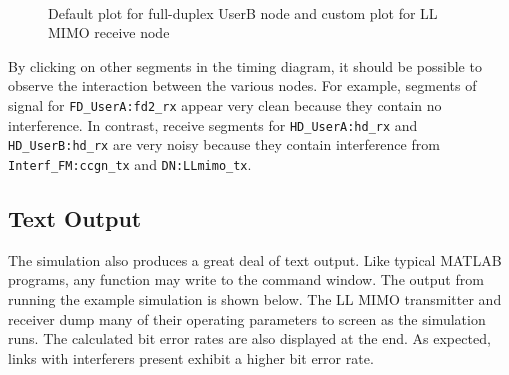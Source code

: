 \begin{figure}[h]
\centering \mbox{
     \quad
     \quad
    }
\caption{Default plot for full-duplex UserB node and custom plot for
LL MIMO receive node} \label{fig:tdCallback}
\end{figure}

By clicking on other segments in the timing diagram, it should be
possible to observe the interaction between the various nodes.  For
example, segments of signal for \verb+FD_UserA:fd2_rx+ appear very
clean because they contain no interference.  In contrast, receive
segments for \verb+HD_UserA:hd_rx+ and \verb+HD_UserB:hd_rx+ are
very noisy because they contain interference from
\verb+Interf_FM:ccgn_tx+ and \verb+DN:LLmimo_tx+.

\subsection{Text Output}

The simulation also produces a great deal of text output.  Like
typical MATLAB programs, any function may write to the command
window.  The output from running the example simulation is shown
below. The LL MIMO transmitter and receiver dump many of their
operating parameters to screen as the simulation runs.  The
calculated bit error rates are also displayed at the end.  As
expected, links with interferers present exhibit a higher bit error
rate.

